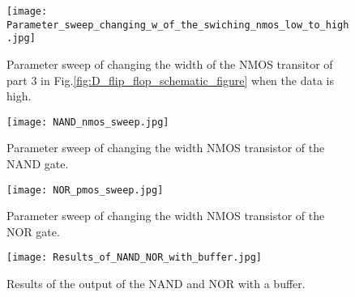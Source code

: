 \begin{appendices}
\begin{figure}[h]
 \texttt{[image: Parameter\_sweep\_changing\_w\_of\_the\_swiching\_nmos\_low\_to\_high.jpg]}
 \caption{Parameter sweep of changing the width of the NMOS transitor of part 3 in Fig.\ref{fig:D_flip_flop_schematic_figure} when the data is high.}
 \label{fig:Parameter_sweep_changing_w_of_the_swiching_nmos_low_to_high_figure}
\end{figure}

\begin{figure}[h]
 \texttt{[image: NAND\_nmos\_sweep.jpg]}
 \caption{Parameter sweep of changing the width NMOS transistor of the NAND gate.}
 \label{fig:NAND_nmos_sweep_figure}
\end{figure}

\begin{figure}[h]
 \texttt{[image: NOR\_pmos\_sweep.jpg]}
 \caption{Parameter sweep of changing the width NMOS transistor of the NOR gate.}
 \label{fig:NOR_pmos_sweep_figure}
\end{figure}

\begin{figure}[h]
 \texttt{[image: Results\_of\_NAND\_NOR\_with\_buffer.jpg]}
 \caption{Results of the output of the NAND and NOR with a buffer.}
 \label{fig:Results_of_NAND_NOR_with_buffer_figure}
\end{figure}


\end{appendices}
